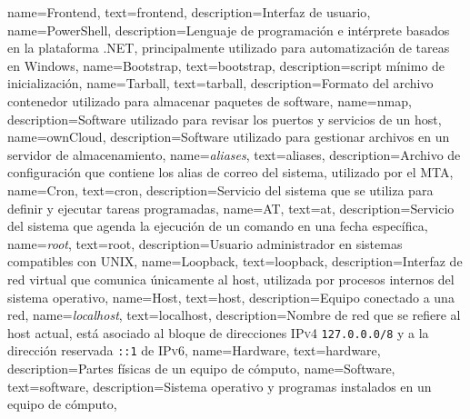 {
  name={Frontend},
  text={frontend},
  description={Interfaz de usuario},
}
{
  name={PowerShell},
  description={Lenguaje de programaci\'{o}n e int\'{e}rprete basados en la plataforma .NET, principalmente utilizado para automatizaci\'{o}n de tareas en Windows},
}
{
  name={Bootstrap},
  text={bootstrap},
  description={\Gls{script} m\'{i}nimo de inicializaci\'{o}n},
}
{
  name={Tarball},
  text={tarball},
  description={Formato del archivo contenedor utilizado para almacenar paquetes de software},
}
{
  name={nmap},
  description={\Gls{Software} utilizado para revisar los puertos y servicios de un \gls{host}},
}
{
  name={ownCloud},
  description={\Gls{Software} utilizado para gestionar archivos en un servidor de almacenamiento},
}
{
  name={\emph{aliases}},
  text={aliases},
  description={Archivo de configuraci\'{o}n que contiene los alias de correo del sistema, utilizado por el \gls{MTA}},
}
{
  name={Cron},
  text={cron},
  description={Servicio del sistema que se utiliza para definir y ejecutar tareas programadas},
}
{
  name={AT},
  text={at},
  description={Servicio del sistema que agenda la ejecuci\'{o}n de un comando en una fecha espec\'{i}fica},
}
{
  name={\emph{root}},
  text={root},
  description={Usuario administrador en sistemas compatibles con \textsc{UNIX}},
}
{
  name={Loopback},
  text={loopback},
  description={Interfaz de red virtual que comunica \'{u}nicamente al \gls{host}, utilizada por procesos internos del sistema operativo},
}
{
  name={Host},
  text={host},
  description={Equipo conectado a una red},
}
{
  name={\emph{localhost}},
  text={localhost},
  description={Nombre de red que se refiere al \gls{host} actual, est\'{a} asociado al bloque de direcciones \textsc{IPv4} \texttt{127.0.0.0/8} y a la direcci\'{o}n reservada \texttt{::1} de \textsc{IPv6}},
}
{
  name={Hardware},
  text={hardware},
  description={Partes f\'{i}sicas de un equipo de c\'{o}mputo},
}
{
  name={Software},
  text={software},
  description={Sistema operativo y programas instalados en un equipo de c\'{o}mputo},
}
